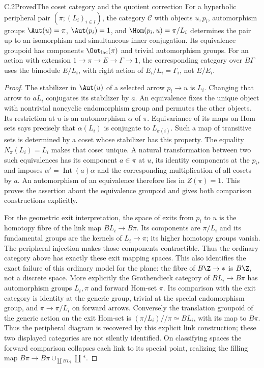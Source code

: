 \begin{claim}{C.2}{Proved}{The coset category and the quotient correction}
For a hyperbolic peripheral pair $(\pi;(L_i)_{i\in I})$, the category
$\mathscr C$ with objects $u,p_i$, automorphism groups
$\Aut(u)=\pi$, $\Aut(p_i)=1$, and
$\Hom(p_i,u)=\pi/L_i$ determines the pair up to an isomorphism and
simultaneous inner conjugation. Its equivalence groupoid has components
$\Out_{\rm lac}(\pi)$ and trivial automorphism groups. For an action with
extension $1\to\pi\to E\to\Gamma\to1$, the corresponding category over
$B\Gamma$ uses the bimodule $E/L_i$, with right action of
$E_i/L_i=\Gamma_i$, not $E/E_i$.
\end{claim}
\begin{proof}
The stabilizer in $\Aut(u)$ of a selected arrow $p_i\to u$ is $L_i$.
Changing that arrow to $aL_i$ conjugates its stabilizer by $a$. An
equivalence fixes the unique object with nontrivial noncyclic
endomorphism group and permutes the other objects. Its restriction at
$u$ is an automorphism $\alpha$ of $\pi$. Equivariance of its maps on
Hom-sets says precisely that $\alpha(L_i)$ is conjugate to
$L_{\sigma(i)}$. Such a map of transitive sets is determined by a coset
whose stabilizer has this property. The equality
$N_\pi(L_i)=L_i$ makes that coset unique. A natural transformation between
two such equivalences has its component $a\in\pi$ at $u$, its identity
components at the $p_i$, and imposes $\alpha'=\operatorname{Int}(a)\alpha$
and the corresponding multiplication of all cosets by $a$. An
automorphism of an equivalence therefore lies in $Z(\pi)=1$.
This proves the assertion about the equivalence groupoid and gives both
comparison constructions explicitly.

For the geometric exit interpretation, the space of exits from $p_i$ to
$u$ is the homotopy fibre of the link map $BL_i\to B\pi$. Its components
are $\pi/L_i$ and its fundamental groups are the kernels of
$L_i\to\pi$; its higher homotopy groups vanish. The peripheral injection
makes those components contractible. Thus the ordinary category above
has exactly these exit mapping spaces. This also identifies the exact
failure of this ordinary model for the plane: the fibre of
$B\Z\to *$ is $B\Z$, not a discrete space. More explicitly the
Grothendieck category of $BL_i\to B\pi$ has automorphism groups
$L_i,\pi$ and forward Hom-set $\pi$. Its comparison with the exit
category is identity at the generic group, trivial at the special
endomorphism group, and $\pi\to\pi/L_i$ on forward arrows. Conversely
the translation groupoid of the generic action on the exit Hom-set
is $(\pi/L_i)//\pi\simeq BL_i$, with its map to $B\pi$. Thus the
peripheral diagram is recovered by this explicit link construction;
these two displayed categories are not silently identified. On
classifying spaces the forward comparison collapses each link to its
special point, realizing the filling map
$B\pi\to B\pi\cup_{\coprod BL_i}\coprod *$.


\end{proof}
